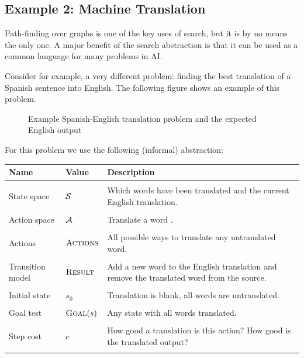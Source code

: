 \documentclass[11pt]{article}
\def\Words{
  \matrix(dict)[matrix of nodes, ampersand replacement=\&]{
    Mary \& golpeo \& la \& bruja \& verde \\
    ~\\
    ~\\
    Mary \& slapped \& the \& green \& witch \\ };
}
\begin{document}
\subsection{Example 2: Machine Translation}

Path-finding over graphs is one of the key uses of search, but it is by no means the only one. A major benefit of the search abstraction is that it can be used as a common language for many problems in AI. 

Consider for example, a very different problem: finding the best translation of a Spanish sentence into English. The following figure shows an example of this problem. 

\begin{figure}[h]
  \centering
  \label{fig:mt}
  \caption{Example Spanish-English translation problem and the expected English output}
\end{figure}

For this problem we use the following (informal) abstraction:


\air 
\begin{center}
\begin{tabularx}{\linewidth}{llX}
  \toprule
  Name & Value & Description \\
  \midrule
\\
 State space & $\mathcal{S}$ & Which words have been translated and the current English translation. \\\\
 Action space & $\mathcal{A}$& Translate a word . \\\\
 Actions&  $\mathrm{\textsc{Actions}}$ & All possible ways to translate any untranslated word. \\\\
 Transition model&  $\mathrm{\textsc{Result}} $ &  Add a new word to the English translation and remove the translated word from the source.    \\\\
 Initial state &  $s_0$ & Translation is blank, all words are untranslated.  \\\\
 Goal test& $\mathrm{\textsc{Goal}}(s)$ & Any state with all words translated. \\\\
 Step cost & $c$ &  How good a translation is this action? How good is the translated output?  \\\\
 \bottomrule
\end{tabularx}
\end{center}
\end{document}
